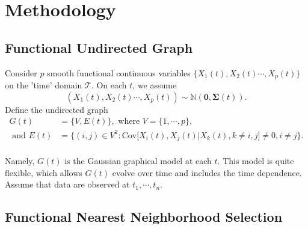 \documentclass[11pt]{article}
\newcommand{\N}{\mathbb N}
\newcommand{\bSigma}{{\boldsymbol{\Sigma}}}
\begin{document}
\section{Methodology}

\subsection{Functional Undirected Graph}
Consider $p$ smooth functional continuous variables $\{ X_1(t), X_2(t) \cdots, X_p(t)\}$ on the 'time' domain $\mathcal{T}$. On each $t$, we assume
$$ (X_1(t), X_2(t) \cdots, X_p(t)) \sim \N(\mathbf{0}, \bSigma(t)). $$ 
Define the undirected graph 
\begin{equation}
	\label{eq:funcgraph}
	\begin{aligned}
	G(t) &= \Big\{ V, E(t) \Big\},\text{ where } V = \Big\{1,\cdots, p\Big\},\\
	\text{ and } E(t) &= \Big\{ (i,j) \in V^2 : \text{Cov} \Big[ X_i(t), X_j(t)| X_k(t), k \neq i,j \Big] \neq 0, i \neq j \Big\}.\\
	\end{aligned}
\end{equation}

Namely, $G(t)$ is the Gaussian graphical model at each $t$. This model is quite flexible, which allows $G(t)$ evolve over time and includes the time dependence. Assume that data are observed at $t_1, \cdots, t_n$. 

\subsection{Functional Nearest Neighborhood Selection}
\end{document}
